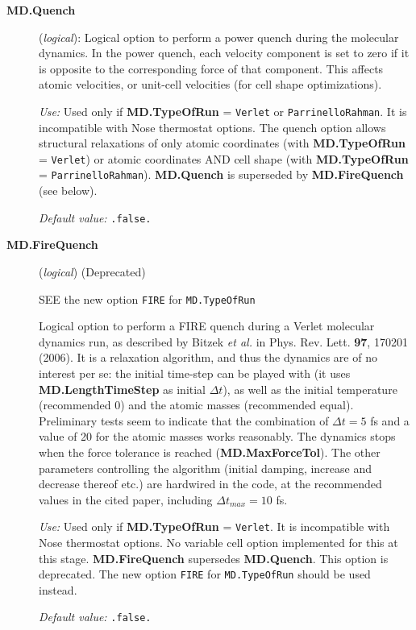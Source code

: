 \documentclass[11pt]{article}
\begin{document}
\begin{description}
\item[{\bf MD.Quench}] ({\it logical}):
Logical option to perform a power quench during the molecular dynamics.
In the power quench, each velocity component is set to
zero if it is opposite to the corresponding force
of that component. This affects atomic velocities,
or unit-cell velocities (for cell shape optimizations).

{\it Use:} Used only if {\bf MD.TypeOfRun} = {\tt Verlet} or
{\tt ParrinelloRahman}.
It is incompatible with Nose thermostat options.
The quench option allows structural relaxations of
only atomic coordinates (with {\bf MD.TypeOfRun} = {\tt Verlet})
or atomic coordinates AND cell shape
(with {\bf MD.TypeOfRun} = {\tt ParrinelloRahman}).
{\bf MD.Quench} is superseded by {\bf MD.FireQuench} (see below).

{\it Default value:} {\tt .false.}

\item[{\bf MD.FireQuench}] ({\it logical}) (Deprecated)

SEE the new option {\tt FIRE} for {\tt MD.TypeOfRun}

Logical option to perform a FIRE quench during a Verlet molecular dynamics
run, as described by Bitzek {\it et al.} in Phys. Rev. Lett. {\bf 97},
170201 (2006). It is a relaxation algorithm, and thus the dynamics
are of no interest per se: the initial time-step can be played with
(it uses {\bf MD.LengthTimeStep} as initial $\Delta t$),
as well as the initial temperature (recommended 0) and the atomic
masses (recommended equal). Preliminary tests seem to indicate that
the combination of $\Delta t = 5$ fs and a value of 20 for the atomic
masses works reasonably. The dynamics stops when the force
tolerance is reached ({\bf MD.MaxForceTol}). The other
parameters controlling the algorithm (initial damping,
increase and decrease thereof etc.) are hardwired in the code,
at the recommended values in the cited paper,
including $\Delta t_{max} = 10$ fs.

{\it Use:} Used only if {\bf MD.TypeOfRun} = {\tt Verlet}.
It is incompatible with Nose thermostat options. No variable
cell option implemented for this at this stage.
{\bf MD.FireQuench} supersedes {\bf MD.Quench}. This option is
deprecated. The new option {\tt FIRE} for {\tt MD.TypeOfRun} should be
used instead.

{\it Default value:} {\tt .false.}

\end{description}
\end{document}
